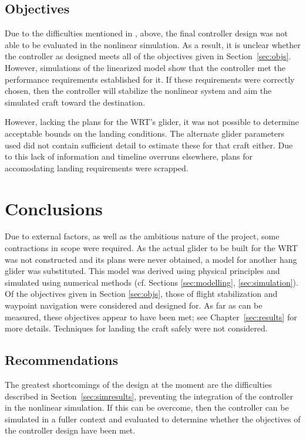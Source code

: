 \documentclass{sydeStyle}
\begin{document}
\section{Objectives}
Due to the difficulties mentioned in , above, the final
controller design was not able to be evaluated in the nonlinear simulation.  As
a result, it is unclear whether the controller as designed meets all of the
objectives given in Section~\ref{sec:objs}.  However, simulations of the
linearized model show that the controller met the performance requirements
established for it.  If these requirements were correctly chosen, then the
controller will stabilize the nonlinear system and aim the simulated craft
toward the destination.

However, lacking the plans for the WRT's glider, it was not possible to
determine acceptable bounds on the landing conditions. The alternate glider
parameters used did not contain sufficient detail to estimate these for that
craft either.  Due to this lack of information and timeline overruns elsewhere,
plans for accomodating landing requirements were scrapped.

\chapter{Conclusions}
Due to external factors, as well as the ambitious nature of the project, some
contractions in scope were required.  As the actual glider to be built for the
WRT was not constructed and its plans were never obtained, a model for another
hang glider was substituted.  This model was derived using physical principles
and simulated using numerical methods (cf. Sections \ref{sec:modelling},
\ref{sec:simulation}).  Of the objectives given in Section \ref{sec:objs}, those
of flight stabilization and waypoint navigation were considered and designed
for.  As far as can be measured, these objectives appear to have been met; see
Chapter~\ref{sec:results} for more details.  Techniques for landing the craft
safely were not considered.

\section{Recommendations}
\label{sec:recommendations}
The greatest shortcomings of the design at the moment are the difficulties
described in Section~\ref{sec:simresults}, preventing the integration of the
controller in the nonlinear simulation.  If this can be overcome, then the
controller can be simulated in a fuller context and evaluated to determine
whether the objectives of the controller design have been met.
\end{document}
